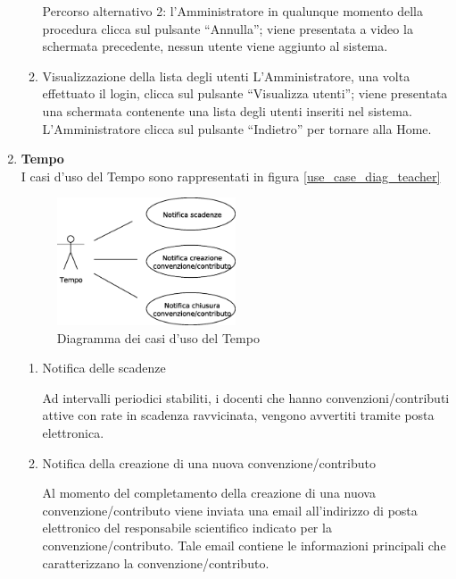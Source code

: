 \begin{enumerate}
\begin{enumerate}
 Percorso alternativo 2:
 l'Amministratore in qualunque momento della procedura clicca sul pulsante ``Annulla''; viene presentata a video la schermata precedente,
 nessun utente viene aggiunto al sistema.
 
 \item Visualizzazione della lista degli utenti \label{UC_view_user_list}
  L'Amministratore, una volta effettuato il login, clicca sul pulsante ``Visualizza utenti''; viene presentata una schermata contenente una lista  degli
  utenti inseriti nel sistema. L'Amministratore clicca sul pulsante ``Indietro'' per tornare alla Home.
\end{enumerate}

\item \textbf{Tempo}\\
I casi d'uso del Tempo sono rappresentati in figura \ref{use_case_diag_teacher}
\begin{figure}[h]
  \caption{Diagramma dei casi d'uso del Tempo}
  \label{use_case_diag_time}
  \centering
\includegraphics[width = 0.5\textwidth]{images/casi_uso_tempo.eps}
\end{figure}
\begin{enumerate}
 \item Notifica delle scadenze\\ \label{UC_notify_deadlines}
 
    Ad intervalli periodici stabiliti, i docenti che hanno convenzioni/contributi attive con rate in scadenza ravvicinata, vengono avvertiti tramite posta elettronica.
  
 
 \item Notifica della creazione di una nuova convenzione/contributo\\ \label{UC_notify_new_contract}
 
    Al momento del completamento della creazione di una nuova convenzione/contributo viene inviata una email all'indirizzo di posta elettronico del responsabile scientifico indicato per la convenzione/contributo. Tale email contiene
    le informazioni principali che caratterizzano la convenzione/contributo.
  

\end{enumerate}
\end{enumerate}
